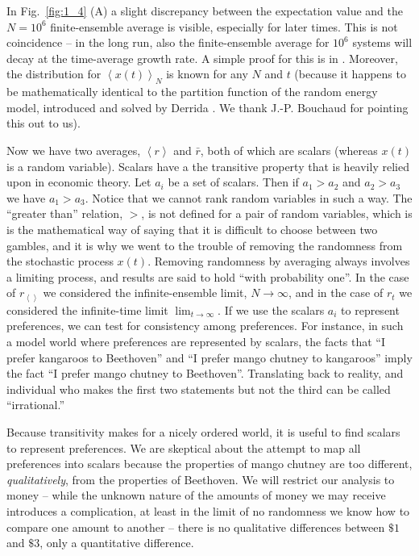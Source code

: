\documentclass[a4paper]{article}
\newcommand{\ave}[1]{\left\langle#1 \right\rangle}
\newcommand{\rex}{r_{\ave{}}}
\newcommand{\rt}{r_{t}}
\newcommand{\fref}[1]{Fig.~\ref{fig:#1}}
\begin{document}
In \fref{1_4} (A) a slight discrepancy between the expectation value and the $N=10^6$ 
finite-ensemble average is visible, especially for later times. This is not coincidence --
in the long run, also the finite-ensemble average for $10^6$ systems will decay
at the time-average growth rate. A simple proof for this is in \cite{PetersKlein2013}.
Moreover, the distribution for $\ave{x(t)}_N$ is known for any $N$ and $t$ (because
it happens to be mathematically identical to the partition function of the random 
energy model, introduced and solved by Derrida \cite{Derrida1981}. We thank 
J.-P. Bouchaud for pointing this out to us).


Now we have two averages, $\ave{r}$ and $\bar{r}$, 
both of which are scalars (whereas $x(t)$ is a random variable).
Scalars have a the transitive property that is heavily relied upon in 
economic theory. Let $a_i$ be a set of scalars. Then if $a_1>a_2$ and 
$a_2>a_3$ we have $a_1>a_3$. Notice that we cannot rank random variables 
in such a way. The ``greater than'' relation, $>$,
is not defined for a pair of random variables, which is is the mathematical
way of saying that it is difficult to choose between two gambles, and it is why 
we went to the trouble of removing the randomness from the stochastic process 
$x(t)$. Removing randomness by
averaging always involves a limiting process, and results are said to hold ``with probability one''. 
In the case of $\rex$ we considered the infinite-ensemble limit, $N\to \infty$, and 
in the case of $\rt$ we considered the infinite-time limit $\lim_{t\to\infty}$. If we use the scalars 
$a_i$ to represent preferences, we can test for consistency among preferences. 
For instance, in such a model world where preferences are represented by scalars, 
the facts that ``I prefer kangaroos to Beethoven'' and ``I prefer mango chutney to kangaroos'' 
imply the fact ``I prefer mango chutney to Beethoven''. Translating back to reality, 
and individual who makes the first two statements but not the third can be
called ``irrational.'' 

Because transitivity makes for a
nicely ordered world, it is useful to find scalars to represent preferences.
We are skeptical about the attempt to map all preferences
into scalars because  the properties of mango chutney are too different, {\it qualitatively},
from the properties of Beethoven. We will restrict our analysis to money --
while the unknown nature of the amounts of money we may receive introduces
a complication, at least in the limit of no randomness we know how to compare one amount to another --
there is no qualitative differences between $\$1$ and $\$3$, only a quantitative difference. 
\end{document}
